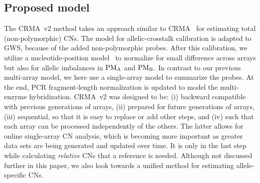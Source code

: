 \documentclass{bioinfo}
\newcommand{\GWS}{GWS\xspace}
\newcommand{\PMA}{\ensuremath{\textnormal{PM}_\textnormal{A}}\xspace}
\newcommand{\PMB}{\ensuremath{\textnormal{PM}_\textnormal{B}}\xspace}
\begin{document}
\subsection{Proposed model}

The CRMA~v2 method takes an approach similar to CRMA~\citep{BengtssonH_etal_2008a} for estimating total (non-polymorphic) CNs.  The model for allelic-crosstalk calibration is adapted to \GWS, because of the added non-polymorphic probes.  After this calibration, we utilize a nucleotide-position model~\citep{CarvalhoB_etal_2006} to normalize for small difference across arrays but also for allelic imbalances in \PMA and \PMB.  
In contrast to our previous multi-array model, we here use a single-array model to summarize the probes.  At the end, PCR fragment-length normalization is updated to model the multi-enzyme hybridization.
CRMA~v2 was designed to be:
(i) backward compatible with previous generations of arrays,
(ii) prepared for future generations of arrays, 
(iii) sequential, so that it is easy to replace or add other steps, and
(iv) such that each array can be processed independently of the others.
The latter allows for online single-array CN analysis, which is becoming more important as greater data sets are being generated and updated over time.
It is only in the last step while calculating \emph{relative} CNs that a reference is needed.
Although not discussed further in this paper, we also look towards a unified method for estimating allele-specific CNs.
\end{document}
